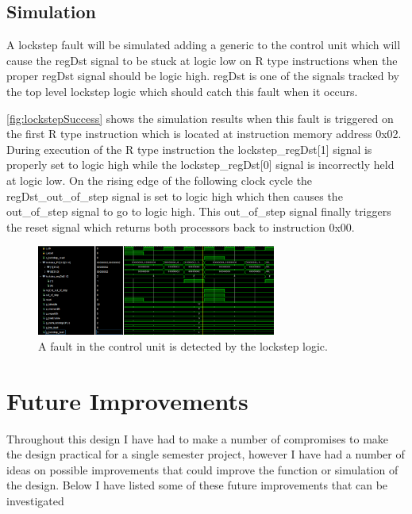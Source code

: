 \documentclass[12pt]{article}
\begin{document}
\subsection{Simulation}
A lockstep fault will be simulated adding a generic to the control unit which will cause the regDst signal to be stuck at logic low on R type instructions when the proper regDst signal should be logic high. regDst is one of the signals tracked by the top level lockstep logic which should catch this fault when it occurs.

\autoref{fig:lockstepSuccess} shows the simulation results when this fault is triggered on the first R type instruction which is located at instruction memory address 0x02. During execution of the R type instruction the lockstep\_regDst[1] signal is properly set to logic high while the lockstep\_regDst[0] signal is incorrectly held at logic low. On the rising edge of the following clock cycle the regDst\_out\_of\_step signal is set to logic high which then causes the out\_of\_step signal to go to logic high. This out\_of\_step signal finally triggers the reset signal which returns both processors back to instruction 0x00.

\begin{figure}[H]
    \centering
    \includegraphics[width=0.7\textwidth]{lockstepSuccess.PNG}
    \caption{A fault in the control unit is detected by the lockstep logic.}
    \label{fig:lockstepSuccess}
\end{figure}

\section{Future Improvements}
Throughout this design I have had to make a number of compromises to make the design practical for a single semester project, however I have had a number of ideas on possible improvements that could improve the function or simulation of the design. Below I have listed some of these future improvements that can be investigated
\end{document}
